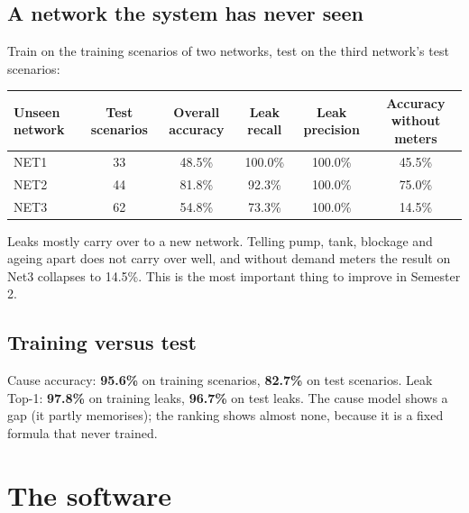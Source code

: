 \documentclass[11pt,a4paper]{article}
\begin{document}
\subsection{A network the system has never seen}
Train on the training scenarios of two networks, test on the third network's test scenarios:
\begin{center}\small\begin{tabular}{@{}lccccc@{}}\toprule
Unseen network & Test scenarios & Overall accuracy & Leak recall & Leak precision & Accuracy without meters \\\midrule
NET1 & 33 & 48.5\% & 100.0\% & 100.0\% & 45.5\% \\
NET2 & 44 & 81.8\% & 92.3\% & 100.0\% & 75.0\% \\
NET3 & 62 & 54.8\% & 73.3\% & 100.0\% & 14.5\% \\
\bottomrule\end{tabular}\end{center}
Leaks mostly carry over to a new network. Telling pump, tank, blockage and ageing apart does not carry over well, and without demand meters the result on Net3 collapses to 14.5\%. This is the most important thing to improve in Semester 2.

\subsection{Training versus test}
Cause accuracy: \textbf{95.6\%} on training scenarios, \textbf{82.7\%} on test scenarios. Leak Top-1: \textbf{97.8\%} on training leaks, \textbf{96.7\%} on test leaks. The cause model shows a gap (it partly memorises); the ranking shows almost none, because it is a fixed formula that never trained.

\section{The software}
\end{document}
